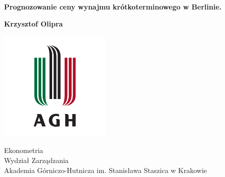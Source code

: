 \begin{titlepage}
    \begin{center}
        \vspace*{1cm}

        \LARGE
        \textbf{Prognozowanie ceny wynajmu krótkoterminowego w Berlinie.}

        \vspace{1.5cm}

        \large
        \textbf{Krzysztof Olipra}

        \vfill
        \includegraphics[width=0.4\textwidth]{assets/agh.png}

        Ekonometria\\
        Wydział Zarządzania\\
        Akademia Górniczo-Hutnicza im. Stanisława Staszica w Krakowie\\

    \end{center}
\end{titlepage}